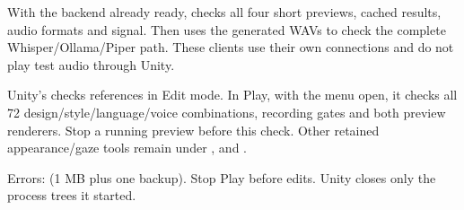 With the backend already ready,  checks all four
short previews, cached results, audio formats and signal. Then
 uses the generated WAVs to check the complete
Whisper/Ollama/Piper path. These clients use their own connections and do not
play test audio through Unity.

Unity's  checks references in
Edit mode. In Play, with the menu open, it checks all 72 design/style/language/voice
combinations, recording gates and both preview renderers. Stop a running preview
before this check. Other retained appearance/gaze tools remain under
,  and .

Errors:  (1 MB plus one backup).
Stop Play before edits. Unity closes only the process trees it started.

